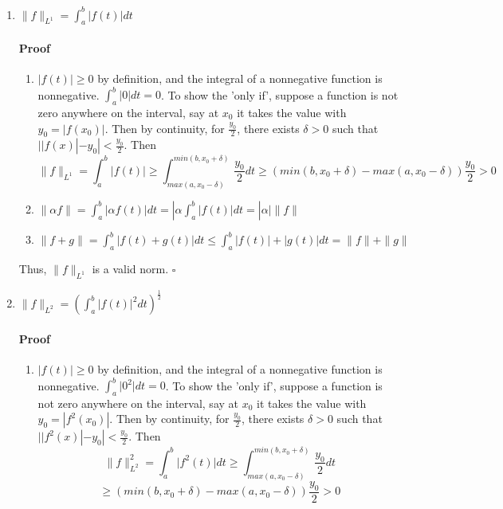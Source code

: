 \documentclass[letterpaper,12pt]{article}
\theoremstyle{definition}
\begin{document}
\begin{enumerate}[label=(\roman*)]

\item $\| f \|_{L^{1}} = \int_a^b\vert f(t) \vert dt$

\paragraph{Proof} 
\begin{enumerate}
\item  $\vert f(t) \vert \ge 0$ by definition, and the integral of a nonnegative function is nonnegative. $\int_a^b\vert 0 \vert dt = 0$. To show the 'only if', suppose a function is not zero anywhere on the interval, say at $x_0$ it takes the value with $y_0 = |f(x_0)|$. Then by continuity, for  $\frac{y_0}{2}$, there exists $\delta > 0$ such that $| |f(x)| - y_0| < \frac{y_0}{2}$. Then 
$$\| f \|_{L^{1}} = \int_a^b\vert f(t) \vert \ge \int_{max(a,x_0-\delta)}^{min(b, x_0 + \delta)} \frac{y_0}{2} dt \ge (min(b, x_0 + \delta) -max(a,x_0-\delta)) \frac{y_0}{2} > 0 $$

\item  $\|\alpha f\| = \int_a^b\vert \alpha f(t) \vert dt= |\alpha \int_a^b\vert f(t) \vert dt = |\alpha| \|f\| $ 
\item  $\|f + g\| = \int_a^b\vert f(t) + g(t) \vert dt \le \int_a^b | f(t)| + |g(t)| dt = \|f \| + \|g\|$
\end{enumerate}
Thus, $\| f \|_{L^{1}}$ is a valid norm. $\square$

\item $\| f \|_{L^{2}} = (\int_a^b\vert f(t) \vert^2 dt)^{\frac{1}{2}}$

\paragraph{Proof} 

\begin{enumerate}
\item  $\vert f(t) \vert \ge 0$ by definition, and the integral of a nonnegative function is nonnegative. $\int_a^b\vert 0^2 \vert dt = 0$. To show the 'only if', suppose a function is not zero anywhere on the interval, say at $x_0$ it takes the value with $y_0 = |f^2(x_0)|$. Then by continuity, for  $\frac{y_0}{2}$, there exists $\delta > 0$ such that $| |f^2(x)| - y_0| < \frac{y_0}{2}$. Then 
$$\| f \|_{L^{2}}^2 = \int_a^b\vert f^2(t) \vert dt \ge \int_{max(a,x_0-\delta)}^{min(b, x_0 + \delta)} \frac{y_0}{2} dt $$
$$\ge (min(b, x_0 + \delta) -max(a,x_0-\delta)) \frac{y_0}{2} > 0 $$


\end{enumerate}
\end{enumerate}
\end{document}
